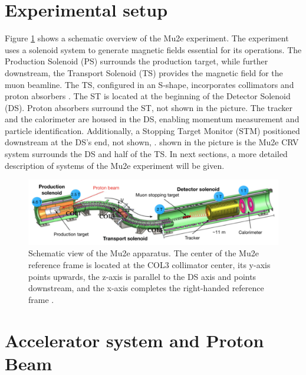 \section{Experimental setup}\label{setup}
Figure \ref{fig:mu2escheme} shows a schematic overview 
of the Mu2e experiment. The experiment uses 
a solenoid system to generate magnetic fields essential 
for its operations. The Production Solenoid (PS) surrounds 
the production target, while further downstream, the 
Transport Solenoid (TS) provides the magnetic field for 
the muon beamline. The TS, configured in an S-shape, 
incorporates collimators and proton absorbers . The ST is 
located at the beginning of the Detector Solenoid (DS). 
Proton absorbers surround the ST, not shown in the picture. 
The tracker and the calorimeter are housed in the DS, 
enabling momentum measurement and particle identification. 
Additionally, a Stopping Target Monitor (STM) positioned 
downstream at the DS's end, not shown, 
.
 shown 
in the picture is the Mu2e CRV system 
surrounds the DS and half of the TS. In next sections, a 
more detailed description of systems of the Mu2e experiment will be given.
\begin{figure}[!h]
\centering
\includegraphics[width =\textwidth]{figures/png/Screenshot_20240301_143105.png}
\caption[The Mu2e apparatus.]{Schematic view of the Mu2e apparatus. The center of the Mu2e reference frame is located at the COL3 collimator center, its y-axis points upwards, the z-axis is parallel to the DS axis and points downstream, and the x-axis completes the right-handed reference frame \cite{universe9010054}.}
\label{fig:mu2escheme}
\end{figure}
\section{Accelerator system and  Proton Beam}\label{accel}
